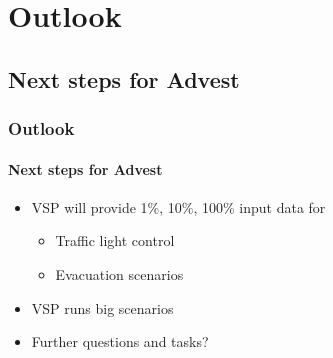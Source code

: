 \section{Outlook}

\subsection{Next steps for Advest}

\begin{frame}
\frametitle{Outlook}
\framesubtitle{Next steps for Advest}
\begin{itemize}
  \item VSP will provide 1\%, 10\%, 100\% input data for
  \begin{itemize}
  	\item Traffic light control
  	\item Evacuation scenarios
  \end{itemize}
  \item VSP runs big scenarios
  \item Further questions and tasks?
\end{itemize}
\end{frame}